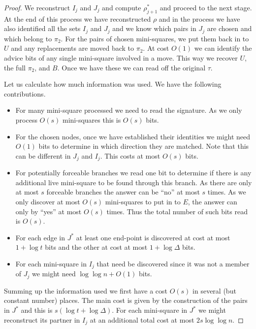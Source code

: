 \documentclass{theoretics}
\begin{document}
\begin{proof}
We reconstruct $I_j$ and $J_j$ and
compute $\rho_{j+1}^*$ and proceed to the next
stage.  At the end of this process we have reconstructed
$\rho$ and in the process we have also identified
all the sets $I_j$ and $J_j$ and we know which pairs
in $J_j$ are chosen and which belong to $\pi_2$.  For the 
pairs of chosen mini-squares, we put them back in to $U$ and
any replacements are moved back to $\pi_2$.  At cost
$O(1)$ we can identify the advice bits of any single
mini-square involved in a move.  This way we recover $U$,
the full $\pi_2$, and $B$.  Once we have these
we can read off the original $\tau$.

Let us calculate how much information
was used.  We have the following contributions.

\begin{itemize}

\item For many mini-square processed we need to
read the signature.  As we only process $O(s)$
mini-squares this is $O(s)$ bits.

\item For the chosen nodes, once we have
established their identities we might need $O(1)$
bits to determine in which direction they are matched.
Note that this can be different in $J_j$ and $I_j$.
This costs at most $O(s)$ bits.

\item For potentially forceable  branches
we read one bit to determine if there is any
additional live mini-square to be found through this branch.
As there are only at most $s$ forceable branches
the answer can be ``no'' at most $s$ times.
As we only discover at most $O(s)$ mini-squares to
put in to $E$, the answer can only by ``yes'' at most $O(s)$ times.
Thus the total number of such bits read is $O(s)$.

\item  For each edge in $J^*$ at least one
end-point is discovered at cost at most $1+\log t$ bits and
the other at cost at most $1+\log \Delta$ bits.

\item For each  mini-square in $I_j$ that need
be discovered since it was not a member of $J_j$
we might need $\log \log n+O(1)$ bits.

\end{itemize}
Summing up the information used we first have
a cost $O(s)$ in several (but constant number) 
places.  The main cost is given by the construction of the
pairs in $J^*$ and this is $s(\log t + \log \Delta)$.
For each mini-square in $J^*$ we might reconstruct
its partner in $I_j$ at an additional total cost 
at most $2s \log \log n$.


\end{proof}
\end{document}
